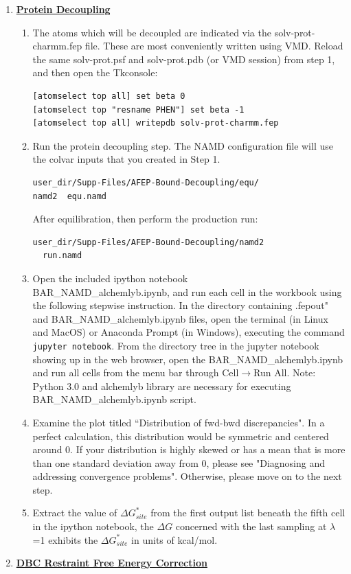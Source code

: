 \documentclass[9pt,tutorial]{livecoms}
\begin{document}
\begin{enumerate}[left=0pt .. \parindent]
\item {\bf \hyperref[section 7]{Protein Decoupling}}
\begin{enumerate}
\item The atoms which will be decoupled are indicated via the solv-prot-charmm.fep file. These are most conveniently written using VMD. Reload the same solv-prot.psf and solv-prot.pdb (or VMD session) from step 1, and then open the Tkconsole:  
\begin{verbatim}
[atomselect top all] set beta 0
[atomselect top "resname PHEN"] set beta -1
[atomselect top all] writepdb solv-prot-charmm.fep
\end{verbatim}
\item Run the protein decoupling step. The NAMD configuration file will use the colvar inputs that you created in Step 1. 
\begin{verbatim}
user_dir/Supp-Files/AFEP-Bound-Decoupling/equ/
namd2  equ.namd
\end{verbatim}
After equilibration, then perform the production run:
\begin{verbatim}
user_dir/Supp-Files/AFEP-Bound-Decoupling/namd2
  run.namd
\end{verbatim}
\item Open the included ipython notebook\\ BAR\_NAMD\_alchemlyb.ipynb, and run each cell in the workbook using the following stepwise instruction. %
In the directory containing .fepout" and BAR\_NAMD\_alchemlyb.ipynb files, open the terminal (in Linux and MacOS) or Anaconda Prompt (in Windows), executing the command \texttt{jupyter notebook}. From the directory tree in the jupyter notebook showing up in the web browser, open the BAR\_NAMD\_alchemlyb.ipynb and run all cells from the menu bar through Cell${\rightarrow}$Run All. Note: Python 3.0 and alchemlyb library are necessary for executing BAR\_NAMD\_alchemlyb.ipynb script. 


\item Examine the plot titled ``Distribution of fwd-bwd discrepancies". In a perfect calculation, this distribution would be symmetric and centered around 0. If your distribution is highly skewed or has a mean that is more than one standard deviation away from 0, please see "Diagnosing and addressing convergence problems". Otherwise, please move on to the next step. 
\item Extract the value of  ${\Delta G^*_{site}}$ from the first output list beneath the fifth cell in the ipython notebook, the ${\Delta G}$ concerned with the last sampling at {$\lambda$}=1 exhibits the ${\Delta G^*_{site}}$ in units of kcal/mol.
\end{enumerate}
\item {\bf \hyperref[sec:10]{DBC Restraint Free Energy Correction}}


\end{enumerate}
\end{document}
